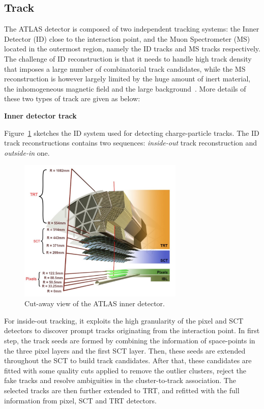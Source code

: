 \subsection{Track}
\label{sec:track}

The ATLAS detector is composed of two independent tracking systems: the Inner Detector (ID) close to the interaction point, and the Muon Spectrometer (MS) located in the outermost region, 
namely the ID tracks and MS tracks respectively.
The challenge of ID reconstruction is that it needs to handle high track density that imposes a large number of combinatorial track candidates, 
while the MS reconstruction is however largely limited by the huge amount of inert material, the inhomogeneous magnetic field and the large background~\cite{Cornelissen:1020106}.
More details of these two types of track are given as below:

\textbf{Inner detector track}

Figure~\ref{fig:track_ID} sketches the ID system used for detecting charge-particle tracks.
The ID track reconstructions contains two sequences: \textit{inside-out} track reconstruction and \textit{outside-in} one.
\begin{figure}[!htb]
  \centering
  \includegraphics[width=0.7\textwidth]{figures/Simulation/track_ID.png}
  \caption{Cut-away view of the ATLAS inner detector.}
  \label{fig:track_ID}
\end{figure}

For inside-out tracking, it exploits the high granularity of the pixel and SCT detectors to discover prompt tracks originating from the interaction point.
In first step, the track seeds are formed by combining the information of space-points in the three pixel layers and the first SCT layer.
Then, these seeds are extended throughout the SCT to build track candidates.
After that, these candidates are fitted with some quality cuts applied to remove the outlier clusters, reject the fake tracks and resolve ambiguities in the cluster-to-track association.
The selected tracks are then further extended to TRT, and refitted with the full information from pixel, SCT and TRT detectors.

